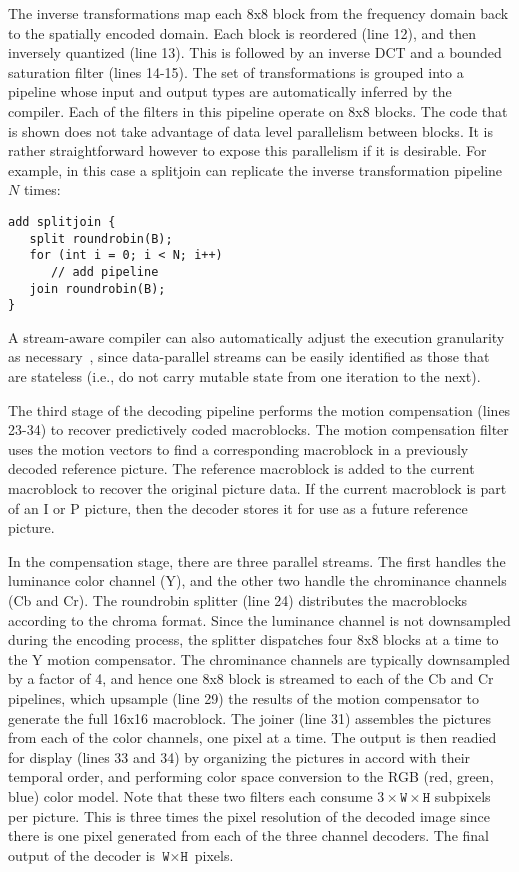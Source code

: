 The inverse transformations map each 8x8 block from the frequency
domain back to the spatially encoded domain. Each block is reordered
(line 12), and then inversely quantized (line 13). This is followed by
an inverse DCT and a bounded saturation filter (lines 14-15). The set
of transformations is grouped into a pipeline whose input
and output types are automatically inferred by the compiler. Each of
the filters in this pipeline operate on 8x8 blocks. The code that is
shown does not take advantage of data level parallelism between
blocks. It is rather straightforward however to expose this
parallelism if it is desirable. For example, in this case a splitjoin
can replicate the inverse transformation pipeline $N$ times:
\begin{center}
\begin{verbatim}
add splitjoin {
   split roundrobin(B);
   for (int i = 0; i < N; i++) 
      // add pipeline
   join roundrobin(B);
}
\end{verbatim}
\end{center}
A stream-aware compiler can also automatically adjust the execution
granularity as necessary~\cite{gordon02asplos}, since data-parallel streams
can be easily identified as those that are stateless (i.e., do not
carry mutable state from one iteration to the next).

The third stage of the decoding pipeline performs the motion
compensation (lines 23-34) to recover predictively coded
macroblocks. The motion compensation filter uses the motion vectors to
find a corresponding macroblock in a previously decoded reference
picture. The reference macroblock is added to the current macroblock
to recover the original picture data. If the current macroblock is
part of an I or P picture, then the decoder stores it for use as a
future reference picture.

In the compensation stage, there are three parallel streams.  The
first handles the luminance color channel (Y), and the other two
handle the chrominance channels (Cb and Cr). The roundrobin splitter
(line 24) distributes the macroblocks according to the chroma
format. Since the luminance channel is not downsampled during the
encoding process, the splitter dispatches four 8x8 blocks at a time to
the Y motion compensator. The chrominance channels are typically
downsampled by a factor of 4, and hence one 8x8 block is streamed to
each of the Cb and Cr pipelines, which upsample (line 29) the results
of the motion compensator to generate the full 16x16 macroblock.  The
joiner (line 31) assembles the pictures from each of the color
channels, one pixel at a time. The output is then readied for display
(lines 33 and 34) by organizing the pictures in accord with their
temporal order, and performing color space conversion to the RGB (red,
green, blue) color model. Note that these two filters each consume
$3\times\texttt{W}\times\texttt{H}$ subpixels per picture. This is
three times the pixel resolution of the decoded image since there is
one pixel generated from each of the three channel decoders. The final
output of the decoder is $\texttt{W}\times\texttt{H}$ pixels.

